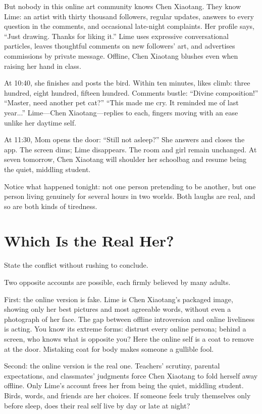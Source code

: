 But nobody in this online art community knows Chen Xiaotang. They know Lime: an artist with thirty thousand followers, regular updates, answers to every question in the comments, and occasional late-night complaints. Her profile says, ``Just drawing. Thanks for liking it.'' Lime uses expressive conversational particles, leaves thoughtful comments on new followers' art, and advertises commissions by private message. Offline, Chen Xiaotang blushes even when raising her hand in class.

At 10:40, she finishes and posts the bird. Within ten minutes, likes climb: three hundred, eight hundred, fifteen hundred. Comments bustle: ``Divine composition!'' ``Master, need another pet cat?'' ``This made me cry. It reminded me of last year...'' Lime---Chen Xiaotang---replies to each, fingers moving with an ease unlike her daytime self.

At 11:30, Mom opens the door: ``Still not asleep?'' She answers and closes the app. The screen dims; Lime disappears. The room and girl remain unchanged. At seven tomorrow, Chen Xiaotang will shoulder her schoolbag and resume being the quiet, middling student.

Notice what happened tonight: not one person pretending to be another, but one person living genuinely for several hours in two worlds. Both laughs are real, and so are both kinds of tiredness.

\section{Which Is the Real Her?}
State the conflict without rushing to conclude.

Two opposite accounts are possible, each firmly believed by many adults.

First: the online version is fake. Lime is Chen Xiaotang's packaged image, showing only her best pictures and most agreeable words, without even a photograph of her face. The gap between offline introversion and online liveliness is acting. You know its extreme forms: distrust every online persona; behind a screen, who knows what is opposite you? Here the online self is a coat to remove at the door. Mistaking coat for body makes someone a gullible fool.

Second: the online version is the real one. Teachers' scrutiny, parental expectations, and classmates' judgments force Chen Xiaotang to fold herself away offline. Only Lime's account frees her from being the quiet, middling student. Birds, words, and friends are her choices. If someone feels truly themselves only before sleep, does their real self live by day or late at night?

